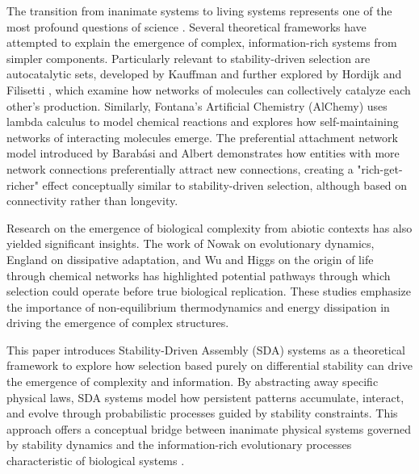 \documentclass[preprint,12pt]{elsarticle}
\begin{document}
The transition from inanimate systems to living systems represents one of the most profound questions of science \cite{schrodinger1944life, pross2016life}. Several theoretical frameworks have attempted to explain the emergence of complex, information-rich systems from simpler components. Particularly relevant to stability-driven selection are autocatalytic sets, developed by Kauffman \cite{kauffman1986autocatalytic} and further explored by Hordijk and Filisetti \cite{hordijk2011required}, which examine how networks of molecules can collectively catalyze each other's production. Similarly, Fontana's Artificial Chemistry (AlChemy) \cite{fontana1991algorithmic} uses lambda calculus to model chemical reactions and explores how self-maintaining networks of interacting molecules emerge. The preferential attachment network model introduced by Barabási and Albert \cite{barabasi1999emergence} demonstrates how entities with more network connections preferentially attract new connections, creating a "rich-get-richer" effect conceptually similar to stability-driven selection, although based on connectivity rather than longevity.

Research on the emergence of biological complexity from abiotic contexts has also yielded significant insights. The work of Nowak \cite{nowak2006evolutionary} on evolutionary dynamics, England \cite{england2015dissipative} on dissipative adaptation, and Wu and Higgs \cite{wu2012origin} on the origin of life through chemical networks has highlighted potential pathways through which selection could operate before true biological replication. These studies emphasize the importance of non-equilibrium thermodynamics \cite{prigogine1977self, nicolis1977self} and energy dissipation in driving the emergence of complex structures.

This paper introduces Stability-Driven Assembly (SDA) systems as a theoretical framework to explore how selection based purely on differential stability can drive the emergence of complexity and information. By abstracting away specific physical laws, SDA systems model how persistent patterns accumulate, interact, and evolve through probabilistic processes guided by stability constraints. This approach offers a conceptual bridge between inanimate physical systems governed by stability dynamics and the information-rich evolutionary processes characteristic of biological systems \cite{noble2012causality, ellis2012top}.
\end{document}
